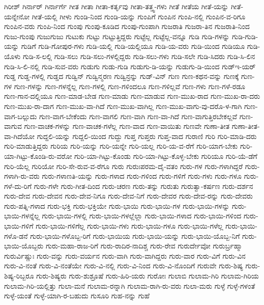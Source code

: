 {ಗಿರೀಶ್
ಗಿರ್ನಾರ್
ಗಿರ್ನಾರ್ಗೆ
ಗೀತ
ಗೀತಾ
ಗೀತಾ-ಕರ್ತೃವು
ಗೀತಾ-ತತ್ತ್ವ-ಗಳು
ಗೀತೆ
ಗೀತೆಯ
ಗೀತೆ-ಯನ್ನು
ಗೀತೆ-ಯನ್ನೇನೋ
ಗೀತೆ-ಯಲ್ಲಿ
ಗೀಳು
ಗುಂಡಿ-ನಿಂದ
ಗುಂಡಿ-ಯನ್ನು
ಗುಂಪಿಗೆ
ಗುಂಪಿನ
ಗುಂಪಿ-ನಲ್ಲಿ
ಗುಂಪಿನ-ವ-ರಿಗೂ
ಗುಂಪಿನ-ವರು
ಗುಂಪಿ-ನಿಂದ
ಗುಂಪು
ಗುಂಪು-ಕೂಡಿದ
ಗುಂಪು-ಗುಂಪಾಗಿ
ಗುಜರಾತಿ
ಗುಜರಾ-ತಿನ
ಗುಜರಾತಿ-ನಿಂದ
ಗುಜು-ಗುಂಪು
ಗುಜುಗುಜು
ಗುಟುಕು
ಗುಟ್ಟು
ಗುಟ್ಟುತ್ತಿದ್ದರು
ಗುಟ್ಟೆಲ್ಲ
ಗುಟ್ಟೆಲ್ಲ-ವನ್ನೂ
ಗುಡಿ
ಗುಡಿ-ಗಳನ್ನು
ಗುಡಿ-ಗುಡಿ-ಯನ್ನು
ಗುಡಿಗೆ
ಗುಡಿ-ಗೋಪುರ-ಗಳು
ಗುಡಿ-ಯಲ್ಲಿ
ಗುಡಿ-ಯಲ್ಲಿಯೂ
ಗುಡಿ-ಯ-ವರು
ಗುಡಿ-ಯಿಂದ
ಗುಡಿಯೂ
ಗುಡಿ-ಯೊಳು
ಗುಡಿ-ಸ-ಲಲ್ಲಿ
ಗುಡಿ-ಸಲು
ಗುಡಿ-ಸಲು-ಗಳಲ್ಲಿದ್ದರು
ಗುಡಿ-ಸಲು-ಗಳು
ಗುಡಿ-ಸಲೇ
ಗುಡಿ-ಸಿದರು
ಗುಡಿ-ಸಿ-ಲಿನ
ಗುಡಿ-ಸಿ-ಲಿ-ನಲ್ಲಿ
ಗುಡಿ-ಸುವ-ವರು
ಗುಡುಗು
ಗುಡು-ಗುಡಿ
ಗುಡುಗು-ಡಿ-ಯನ್ನು
ಗುಡುಗು-ಡಿ-ಯಿಂದ
ಗುಡ್ಇ-ಯರ್
ಗುಡ್ಡ
ಗುಡ್ಡ-ಗಳಲ್ಲಿ
ಗುಡ್ಡದ
ಗುಡ್ವಿನ್
ಗುಡ್ವಿನ್ಮರಣ
ಗುಡ್ವಿನ್ರನ್ನು
ಗುಡ್-ವಿನ್
ಗುಣ
ಗುಣ-ಕಥನ-ವನ್ನು
ಗುಣಕ್ಕೆ
ಗುಣ-ಗಳ
ಗುಣ-ಗಳನ್ನು
ಗುಣ-ಗಳನ್ನೆಲ್ಲ
ಗುಣ-ಗಳಲ್ಲಿ
ಗುಣ-ಗಳಿಂದಲೂ
ಗುಣ-ಗಳಿಲ್ಲವೆ
ಗುಣ-ಗಳು
ಗುಣ-ಗಳೆ-ರಡೂ
ಗುಣ-ಗಾನ-ದಲ್ಲಿಯೂ
ಗುಣ-ಮಾಡ-ಬೇಡ
ಗುಣ-ಮಾಡು
ಗುಣ-ಮಾಡುವ
ಗುಣ-ಮುಖ-ರಾದ
ಗುಣ-ಮುಖ-ರಾ-ದರು
ಗುಣ-ಮುಖ-ರಾ-ದಾಗ
ಗುಣ-ಮುಖ-ವಾ-ಗಿದೆ
ಗುಣ-ಮುಖ-ವಾಗಿಲ್ಲ
ಗುಣ-ಮುಖ-ವಾಗು-ವು-ದರೊ-ಳ-ಗಾಗಿ
ಗುಣ-ವಾಗ-ಬಲ್ಲುದು
ಗುಣ-ವಾಗ-ಬೇಕೆಂದು
ಗುಣ-ವಾಗಲಿ
ಗುಣ-ವಾಗಿ
ಗುಣ-ವಾ-ಗಿದೆ
ಗುಣ-ವಾಗುತ್ತಿರಬೇಕಲ್ಲವೆ
ಗುಣ-ವಾಗುವ
ಗುಣ-ವಾಚಕ-ಗಳನ್ನು
ಗುಣ-ವಾಚಕ-ಗಳೆಲ್ಲ
ಗುಣ-ವಾದ
ಗುಣ-ವಾಯಿತು
ಗುಣವೇ
ಗುಣಾ-ತೀತ
ಗುಣಾ-ತೀತ-ವಾ-ಗಿದೆಯೋ
ಗುದ್ದಲಿ-ಯನ್ನು
ಗುದ್ದಲಿ-ಯಿಂದ
ಗುದ್ದು
ಗುಪ್ತ
ಗುಪ್ತರು
ಗುಪ್ತ-ವಾದ
ಗುರಾಣಿ
ಗುರಿ
ಗುರಿ-ಮಾಡಿ-ದರು
ಗುರಿ-ಮಾಡುತ್ತಿದ್ದರು
ಗುರಿಯ
ಗುರಿ-ಯನ್ನು
ಗುರಿ-ಯನ್ನೇ
ಗುರಿ-ಯಲ್ಲ
ಗುರಿ-ಯ-ವ-ರೆಗೆ
ಗುರಿ-ಯಾಗ-ಬೇಕು
ಗುರಿ-ಯಾ-ಗಿಟ್ಟು-ಕೊಂಡಿ-ರು-ವರೋ
ಗುರಿ-ಯಾ-ಗಿಟ್ಟು-ಕೊಂಡು
ಗುರಿ-ಯಾ-ಗಿಟ್ಟು-ಕೊಳ್ಳ-ಬೇಕು
ಗುರಿಯೂ
ಗುರಿ-ಯೆ-ಡೆಗೆ
ಗುರಿ-ಯೆಲ್ಲ
ಗುರಿಯೋ
ಗುರಿ-ಸೇ-ರುವ-ವ-ರೆಗೂ
ಗುರು
ಗುರುಃಪರಮ-ದೈ-ವತಂ
ಗುರು-ಗಳ
ಗುರು-ಗಳಾಗಿದ್ದರೆ
ಗುರು-ಗಳಾಗಿ-ರು-ವರು
ಗುರು-ಗಳಾಣತಿ-ಯನ್ನು
ಗುರು-ಗಳಾದ
ಗುರು-ಗಳಿಂದ
ಗುರು-ಗಳಿಗೆ
ಗುರು-ಗಳು
ಗುರು-ಗಳೂ
ಗುರು-ಗಳೆ-ದು-ರಿಗೆ
ಗುರು-ಗಳೇ
ಗುರು-ಗೀತ-ದಿಂದ
ಗುರು-ಚರಣ
ಗುರು-ತನ್ನು
ಗುರುತು
ಗುರುತ್ವಾ-ಕರ್ಷಣ
ಗುರು-ದರ್ಶನ
ಗುರು-ದೇವ
ಗುರು-ದೇವನ
ಗುರು-ದೇವ-ನಿಗೂ
ಗುರು-ದೇವ-ನಿಗೆ
ಗುರು-ದೇವರ
ಗುರು-ದೇವ-ರನ್ನು
ಗುರು-ದೇವರು
ಗುರು-ಪತ್ನಿ-ಗಳಾದ
ಗುರು-ಭಕ್ತಿ
ಗುರು-ಭಕ್ತಿಯೇ
ಗುರು-ಭಾಯಿ
ಗುರು-ಭಾಯಿ-ಗಳ
ಗುರು-ಭಾಯಿ-ಗಳನ್ನು
ಗುರು-ಭಾಯಿ-ಗಳನ್ನೆಲ್ಲ
ಗುರು-ಭಾಯಿ-ಗಳಲ್ಲಿ
ಗುರು-ಭಾಯಿ-ಗಳಲ್ಲೆಲ್ಲಾ
ಗುರು-ಭಾಯಿ-ಗಳಾದ
ಗುರು-ಭಾಯಿ-ಗಳಿಂದ
ಗುರು-ಭಾಯಿ-ಗಳಿಗೆ
ಗುರು-ಭಾಯಿ-ಗಳಿಗೆಲ್ಲ
ಗುರು-ಭಾಯಿ-ಗಳು
ಗುರು-ಭಾಯಿ-ಗಳೂ
ಗುರು-ಭಾಯಿ-ಗಳೆಲ್ಲ
ಗುರು-ಭಾಯಿ-ಗಳೊ-ಡನೆ
ಗುರು-ಭಾಯಿ-ಗಳೊಬ್ಬ-ರಿಗೆ
ಗುರು-ಭಾಯಿಯ
ಗುರು-ಭಾಯಿ-ಯನ್ನು
ಗುರು-ಭಾಯಿ-ಯೊಬ್ಬ-ನಿಗೆ
ಗುರು-ಭಾಯಿ-ಯೊಬ್ಬರು
ಗುರು-ಮಹಾ-ರಾಜ-ರಿಗೆ
ಗುರು-ರಾದಿರ-ನಾದಿಶ್ಚ
ಗುರು-ರೇವ
ಗುರುರ್ದೇವೋ
ಗುರುರ್ಬ್ರಹ್ಮಾ
ಗುರುರ್ವಿಷ್ಣುಃ
ಗುರು-ವನ್ನು
ಗುರು-ವರ್ಯನ
ಗುರು-ವಾಗಿ
ಗುರು-ವಾಗಿದ್ದರು
ಗುರು-ವಾರ
ಗುರು-ವಿಗೆ
ಗುರು-ವಿನ
ಗುರು-ವಿ-ನಂತೆ
ಗುರು-ವಿ-ನಂತೆಯೇ
ಗುರು-ವಿ-ನಲ್ಲಿ
ಗುರು-ವಿ-ನಿಂದ
ಗುರು-ವಿ-ನೊಂದಿಗೆ
ಗುರುವೇ
ಗುರು-ಶಿಷ್ಯ
ಗುರು-ಶಿಷ್ಯ-ರಿಬ್ಬರೂ
ಗುರು-ಶಿಷ್ಯರು
ಗುರು-ಶುಶ್ರೂಷೆ
ಗುರು-ಹಿರಿ-ಯರು
ಗುರೋಃ
ಗುಲಾಬಿ
ಗುಲಾಮ-ಗಿರಿ
ಗುಲಾಮ-ಗಿರಿಯ
ಗುಲಾಮ-ಗಿರಿ-ಯಲ್ಲಿತ್ತು
ಗುಲಾ-ಮನೆ
ಗುಲಾಮ-ರನ್ನಾಗಿ
ಗುಲಾಮ-ರಾಗಿ-ರು-ವರು
ಗುಲಾ-ಮರು
ಗುಳ್ಳೆ
ಗುಳ್ಳೆ-ಗಳಂತೆ
ಗುಳ್ಳೆ-ಯಂತೆ
ಗುಳ್ಳೆ-ಯಾಗಿ-ರ-ಬಹುದು
ಗುಸೂರಿ
ಗುಹ-ನನ್ನು
ಗುಹೆ
}
